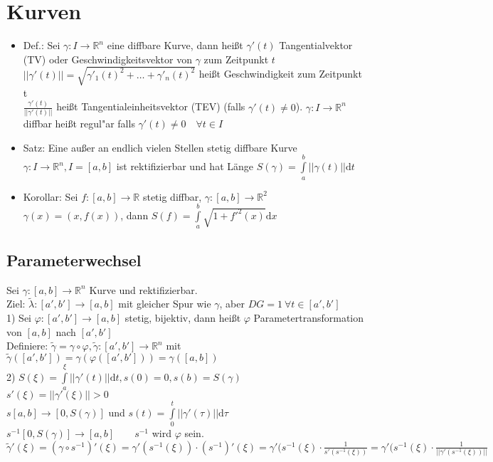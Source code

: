 \documentclass[10pt,a4paper^, twocolumn]{article}
\newcommand{\menge}{\mathbb} %
\renewcommand{\phi}{\varphi} %
\renewcommand{\d}{\mathrm{d}} %
\begin{document}
\section{Kurven}
\begin{itemize}
\item{Def.:} Sei $\gamma : I \rightarrow \menge{R}^n$ eine diffbare Kurve, 
dann heißt $\gamma'(t)$ Tangentialvektor (TV) oder Geschwindigkeitsvektor von $\gamma$ zum Zeitpunkt $t$ \\
$||\gamma'(t)|| = \sqrt{\gamma'_1(t)^2 + \dots + \gamma'_n(t)^2}$ heißt Geschwindigkeit zum Zeitpunkt t \\
$\frac{\gamma'(t)}{||\gamma'(t)||}$ heißt Tangentialeinheitsvektor (TEV) (falls $\gamma'(t) \neq 0$).
$\gamma: I \rightarrow \menge{R}^n$ diffbar heißt regul"ar falls $\gamma'(t) \neq 0 \quad \forall t \in I$
\item{Satz:} Eine außer an endlich vielen Stellen stetig diffbare Kurve $\gamma: I \rightarrow \menge{R}^n, I=[a,b]$ ist rektifizierbar und hat Länge
$S(\gamma) = \int\limits_a^b || \gamma(t) || \d t$
\item{Korollar:} Sei $f:[a,b] \rightarrow \menge{R}$ stetig diffbar, $\gamma:[a,b] \rightarrow \menge{R}^2$ \\
$\gamma(x) = (x, f(x))$, 
dann $S(f) = \int\limits_a^b\sqrt{1+f'^2(x)} \d x $
\end{itemize}


\subsection{Parameterwechsel}
Sei $\gamma : [a,b] \rightarrow \menge{R}^n$ Kurve und rektifizierbar. \\
Ziel: $\tilde\lambda : [a', b'] \rightarrow [a,b]$ mit gleicher Spur wie $\gamma$, aber $DG = 1 \ \forall t \in [a', b']$ \\
1)  Sei $\phi:[a', b'] \rightarrow [a,b]$ stetig, bijektiv, dann heißt $\phi$ Parametertransformation von $[a,b]$ nach $[a',b']$ \\
Definiere: $\tilde\gamma = \gamma \circ \phi, \tilde\gamma:[a', b'] \rightarrow \menge{R}^n$ mit $\tilde\gamma([a',b']) = \gamma(\phi([a',b'])) = \gamma([a,b])$ \\
2) $S(\xi) = \int\limits_a^\xi ||\gamma'(t)|| \d t, s(0) = 0, s(b) = S(\gamma)$ \\
$s'(\xi) = ||\gamma'(\xi)|| > 0$ \\
$s [a,b] \rightarrow [0, S(\gamma)]$ und $s(t) = \int\limits_0^t ||\gamma'(\tau)|| \d \tau $ \\
$s^{-1}[0,S(\gamma)] \rightarrow [a,b] \qquad s^{-1}$ wird $\phi$ sein. \\
$\tilde\gamma'(\xi) = (\gamma \circ s^{-1})'(\xi) = \gamma'(s^{-1}(\xi)) \cdot (s^{-1})'(\xi) = 
\gamma'(s^{-1}(\xi)\cdot \frac{1}{s'(s^{-1}(\xi))} = \gamma'(s^{-1}(\xi) \cdot \frac{1}{||\gamma'(s^{-1}(\xi))||}$
\end{document}
